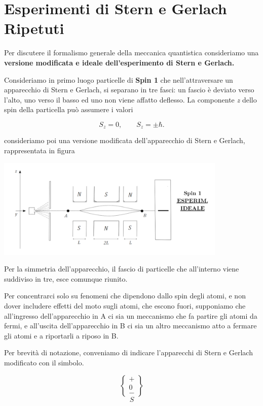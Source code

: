 \section{Esperimenti di Stern e Gerlach Ripetuti} 
Per discutere il formalismo generale della meccanica quantistica consideriamo una \textbf{versione modificata e ideale dell'esperimento di Stern e Gerlach.}
 
Consideriamo in primo luogo particelle di \textbf{Spin 1} che nell'attraversare un apparecchio di Stern e Gerlach, si separano in tre fasci: un fascio è deviato verso l'alto, uno verso il basso ed uno non viene affatto deflesso. La componente \emph{z} dello spin della particella può assumere i valori

\begin{equation}
S_z=0, \qquad S_z= \pm \hbar .
\end{equation}

consideriamo poi una versione modificata dell'apparecchio di Stern e Gerlach, rappresentata in figura \\
\begin{center}
\includegraphics[width=11cm]{immagini/cap_3/fig_3_3.png}
\end{center}

Per la simmetria dell'apparecchio, il fascio di particelle che all'interno viene suddiviso in tre, esce comunque riunito.

Per concentrarci solo su fenomeni che dipendono dallo spin degli atomi, e non  dover includere effetti del moto sugli atomi, che escono fuori, supponiamo che all'ingresso dell'apparecchio in A ci sia un meccanismo che fa partire gli atomi da fermi, e all'uscita dell'apparecchio in B ci sia un altro meccanismo atto a fermare gli atomi e a riportarli a riposo in B.

Per brevità  di notazione, conveniamo di indicare l'apparecchi di Stern e Gerlach modificato con il simbolo.

\begin{equation}
\begin{Bmatrix} + \\ 0 \\ -  \end{Bmatrix}
\end{equation}
\begin{equation*}
S
\end{equation*}
 
